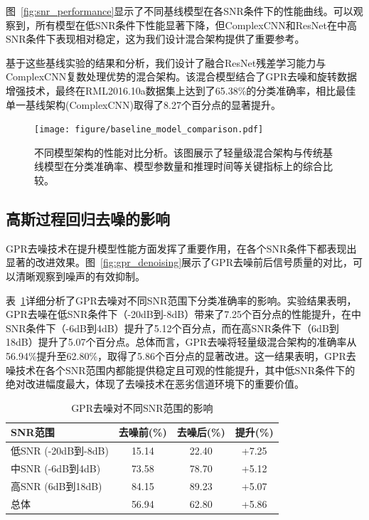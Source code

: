 \documentclass[conference]{IEEEtran}
\begin{document}
图~\ref{fig:snr_performance}显示了不同基线模型在各SNR条件下的性能曲线。可以观察到，所有模型在低SNR条件下性能显著下降，但ComplexCNN和ResNet在中高SNR条件下表现相对稳定，这为我们设计混合架构提供了重要参考。

基于这些基线实验的结果和分析，我们设计了融合ResNet残差学习能力与ComplexCNN复数处理优势的混合架构。该混合模型结合了GPR去噪和旋转数据增强技术，最终在RML2016.10a数据集上达到了65.38\%的分类准确率，相比最佳单一基线架构(ComplexCNN)取得了8.27个百分点的显著提升。

\begin{figure}[htbp]
\centering
\texttt{[image: figure/baseline\_model\_comparison.pdf]}
\caption{不同模型架构的性能对比分析。该图展示了轻量级混合架构与传统基线模型在分类准确率、模型参数量和推理时间等关键指标上的综合比较。}
\label{fig:model_comparison}
\end{figure}

\subsection{高斯过程回归去噪的影响}

GPR去噪技术在提升模型性能方面发挥了重要作用，在各个SNR条件下都表现出显著的改进效果。图~\ref{fig:gpr_denoising}展示了GPR去噪前后信号质量的对比，可以清晰观察到噪声的有效抑制。

表~\ref{tab:gpr_impact}详细分析了GPR去噪对不同SNR范围下分类准确率的影响。实验结果表明，GPR去噪在低SNR条件下（-20dB到-8dB）带来了7.25个百分点的性能提升，在中SNR条件下（-6dB到4dB）提升了5.12个百分点，而在高SNR条件下（6dB到18dB）提升了5.07个百分点。总体而言，GPR去噪将轻量级混合架构的准确率从56.94\%提升至62.80\%，取得了5.86个百分点的显著改进。这一结果表明，GPR去噪技术在各个SNR范围内都能提供稳定且可观的性能提升，其中低SNR条件下的绝对改进幅度最大，体现了去噪技术在恶劣信道环境下的重要价值。

\begin{table}[h]
\centering
\caption{GPR去噪对不同SNR范围的影响}
\label{tab:gpr_impact}
\begin{tabular}{@{}lccc@{}}
\toprule
SNR范围 & 去噪前(\%) & 去噪后(\%) & 提升(\%) \\
\midrule
低SNR (-20dB到-8dB) & 15.14 & 22.40 & +7.25 \\
中SNR (-6dB到4dB) & 73.58 & 78.70 & +5.12 \\
高SNR (6dB到18dB) & 84.15 & 89.23 & +5.07 \\
总体 & 56.94 & 62.80 & +5.86 \\
\bottomrule
\end{tabular}
\end{table}
\end{document}
